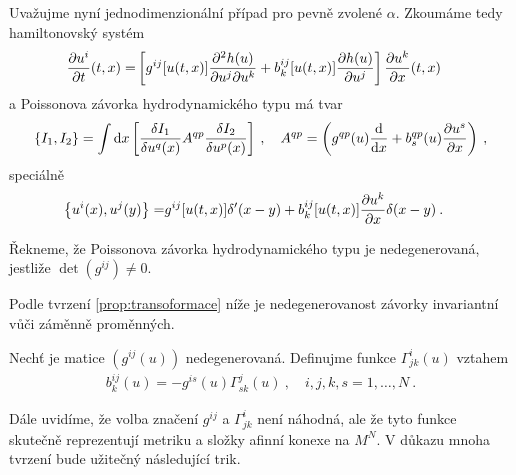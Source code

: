 Uvažujme nyní jednodimenzionální případ pro pevně zvolené $\alpha$. Zkoumáme tedy hamiltonovský systém
\begin{align}
    \frac{\partial u^i}{\partial t} (t,x) =&
    \left[ g^{ij} [u(t,x)] \frac{\partial^2 h(u)}{\partial u^j \partial u^k} + b_k^{ij} [u(t,x)] \frac{\partial h(u)}{\partial u^j} \right] \frac{\partial u^k}{\partial x}(t,x) 
\end{align}
a Poissonova závorka hydrodynamického typu má tvar
\begin{align}
    \left \lbrace I_1,I_2 \right \rbrace = \int \mathrm{d} x
    \left[ \frac{\delta I_1}{\delta u^q(x)} A^{qp} \frac{\delta I_2}{\delta u^p(x)} \right] \:, \quad A^{qp} = \left( g^{qp}(u) \frac{\mathrm{d}}{\mathrm{d}x} + b^{qp}_s(u) \frac{\partial u^s}{\partial x} \right) \:,
\end{align}
speciálně
\begin{align}
    \left \lbrace u^i(x), u^j(y) \right \rbrace =& g^{ij} [u(t,x)] \delta'(x-y) + b_k^{ij} [u(t,x)] \frac{\partial u^k}{\partial x} \delta(x-y) \:. \label{eq:Poisson1D}
\end{align}

\begin{definition}
    Řekneme, že Poissonova závorka hydrodynamického typu je nedegenerovaná, jestliže $\det(g^{ij}) \neq 0$.
\end{definition}
Podle tvrzení \vref{prop:transoformace} níže je nedegenerovanost závorky invariantní vůči záměnně proměnných.

\begin{definition}
    Nechť je matice $(g^{ij}(u))$ nedegenerovaná. Definujme funkce $\Gamma^{i}_{jk}(u)$ vztahem
        \begin{align}
            b_k^{ij}(u) = -g^{is}(u) \Gamma^j_{sk}(u) \:, \quad i,j,k,s=1,\dots,N \:.
        \end{align}
\end{definition}

Dále uvidíme, že volba značení $g^{ij}$ a $\Gamma^{i}_{jk}$ není náhodná, ale že tyto funkce skutečně reprezentují metriku a složky afinní konexe na $M^N$. V důkazu mnoha tvrzení bude užitečný následující trik.

